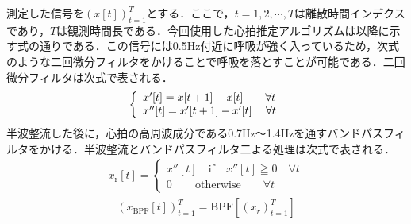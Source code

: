 測定した信号を$\left(x[t]\right)_{t=1}^{T}$とする．ここで，$t=1, 2, \cdots , T$は離散時間インデクスであり，$T$は観測時間長である．今回使用した心拍推定アルゴリズムは以降に示す式の通りである．この信号には0.5Hz付近に呼吸が強く入っているため，次式のような二回微分フィルタをかけることで呼吸を落とすことが可能である．二回微分フィルタは次式で表される．
\begin{align}
  \left\{ \begin{array}{ll}
    x'[t]=x[t+1]-x[t]\quad\quad \forall{t} \\
    x''[t]=x'[t+1]-x'[t]\hspace{12.5pt} \forall{t}
  \end{array} \right. \label{eq:diffilter}
\end{align}
半波整流した後に，心拍の高周波成分である0.7Hz～1.4Hzを通すバンドパスフィルタをかける．半波整流とバンドパスフィルタ二よる処理は次式で表される．
\begin{align}
  x_{\mathrm{r}}[t] = \left\{ \begin{array}{ll}
    x''[t]\quad \mathrm{if}\quad x''[t]\geqq0\quad \forall{t} \\
    0\hspace{25pt} \mathrm{otherwise}\hspace{24pt} \forall{t}
  \end{array} \right. \label{eq:hrec}
\end{align}
\begin{align}
    \left(x_{\mathrm{BPF}}[t]\right)_{t=1}^{T}=\mathrm{BPF}\left[\left(x_{r}\right)_{t=1}^{T}\right]
\end{align} \label{eq:bpf}

